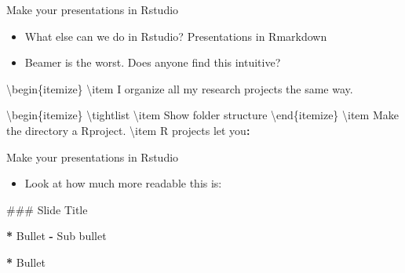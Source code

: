 \documentclass[ignorenonframetext,]{beamer}
\newenvironment{Shaded}{\begin{snugshade}}{\end{snugshade}}
\newcommand{\NormalTok}[1]{#1}
\newcommand{\OperatorTok}[1]{\textcolor[rgb]{0.81,0.36,0.00}{\textbf{#1}}}
\newcommand{\StringTok}[1]{\textcolor[rgb]{0.31,0.60,0.02}{#1}}
\providecommand{\tightlist}{%
  \setlength{\itemsep}{0pt}\setlength{\parskip}{0pt}}
\begin{document}
\begin{frame}[fragile]{Make your presentations in Rstudio}
\protect\hypertarget{make-your-presentations-in-rstudio}{}

\begin{itemize}
\item
  What else can we do in Rstudio? \alert{Presentations} in Rmarkdown
\item
  Beamer is the worst. Does anyone find this intuitive?
\end{itemize}

\begin{Shaded}
\begin{Highlighting}[]
\NormalTok{\textbackslash{}begin\{itemize\}}
\NormalTok{\textbackslash{}item}
\NormalTok{  I organize all my research projects the same way.}

\NormalTok{  \textbackslash{}begin\{itemize\}}
\NormalTok{  \textbackslash{}tightlist}
\NormalTok{  \textbackslash{}item}
\NormalTok{    Show folder structure}
\NormalTok{  \textbackslash{}end\{itemize\}}
\NormalTok{\textbackslash{}item}
\NormalTok{  Make the directory a Rproject.}
\NormalTok{\textbackslash{}item}
\NormalTok{  R projects let you}\OperatorTok{:}
\end{Highlighting}
\end{Shaded}

\end{frame}

\begin{frame}[fragile]{Make your presentations in Rstudio}
\protect\hypertarget{make-your-presentations-in-rstudio-1}{}

\begin{itemize}
\tightlist
\item
  Look at how much more readable this is:
\end{itemize}

\begin{Shaded}
\begin{Highlighting}[]
\NormalTok{### Slide Title}

\OperatorTok{*}\StringTok{ }\NormalTok{Bullet}
  \OperatorTok{-}\StringTok{ }\NormalTok{Sub bullet}
  
\OperatorTok{*}\StringTok{ }\NormalTok{Bullet}
\end{Highlighting}
\end{Shaded}

\end{frame}
\end{document}
